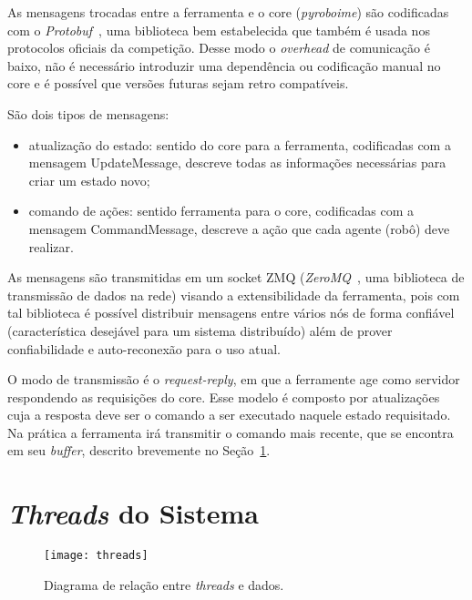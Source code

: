 As mensagens trocadas entre a ferramenta e o core (\textit{pyroboime}) são
codificadas com o \textit{Protobuf}~\cite{protobufdocs}, uma biblioteca bem
estabelecida que também é usada nos protocolos oficiais da competição.  Desse
modo o \textit{overhead} de comunicação é baixo, não é necessário introduzir uma
dependência ou codificação manual no core e é possível que versões futuras sejam
retro compatíveis.

São dois tipos de mensagens:

\begin{itemize}
  \item atualização do estado: sentido do core para a ferramenta, codificadas
    com a mensagem UpdateMessage, descreve todas as informações necessárias para
    criar um estado novo;
  \item comando de ações: sentido ferramenta para o core, codificadas com a
    mensagem CommandMessage, descreve a ação que cada agente (robô) deve
    realizar.
\end{itemize}


As mensagens são transmitidas em um socket ZMQ (\textit{ZeroMQ}~\cite{zmqdocs},
uma biblioteca de transmissão de dados na rede) visando a extensibilidade da
ferramenta, pois com tal biblioteca é possível distribuir mensagens entre vários
nós de forma confiável (característica desejável para um sistema distribuído)
além de prover confiabilidade e auto-reconexão para o uso atual.

O modo de transmissão é o \textit{request-reply}, em que a ferramente age como
servidor respondendo as requisições do core. Esse modelo é composto por
atualizações cuja a resposta deve ser o comando a ser executado naquele estado
requisitado.  Na prática a ferramenta irá transmitir o comando mais recente,
que se encontra em seu \textit{buffer}, descrito brevemente no
Seção~\ref{sec:threads}.

\section{\textit{Threads} do Sistema}\label{sec:threads}

\begin{figure}[H]
  \centering
  \texttt{[image: threads]}
  \caption{Diagrama de relação entre \textit{threads} e
  dados.}\label{fig:arch_threads}
\end{figure}

